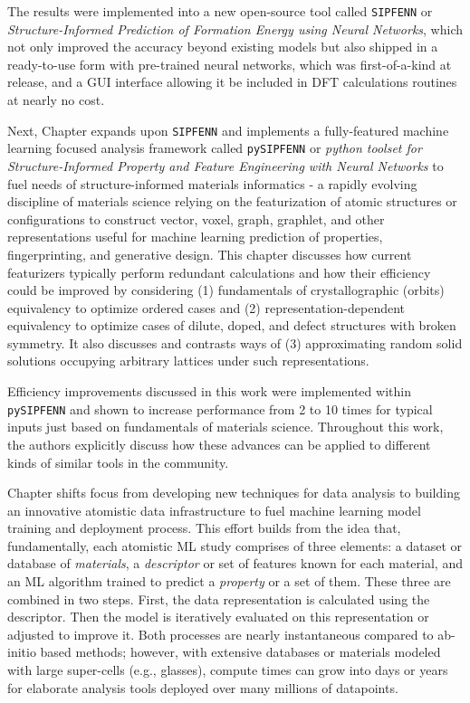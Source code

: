 The results were implemented into a new open-source tool called \texttt{SIPFENN} or \textit{Structure-Informed Prediction of Formation Energy using Neural Networks}, which not only improved the accuracy beyond existing models but also shipped in a ready-to-use form with pre-trained neural networks, which was first-of-a-kind at release, and a GUI interface allowing it be included in DFT calculations routines at nearly no cost.


Next, Chapter  expands upon \texttt{SIPFENN} and implements a fully-featured machine learning focused analysis framework called \texttt{pySIPFENN} or \textit{python toolset for Structure-Informed Property and Feature Engineering with Neural Networks} to fuel needs of structure-informed materials informatics - a rapidly evolving discipline of materials science relying on the featurization of atomic structures or configurations to construct vector, voxel, graph, graphlet, and other representations useful for machine learning prediction of properties, fingerprinting, and generative design. This chapter discusses how current featurizers typically perform redundant calculations and how their efficiency could be improved by considering (1) fundamentals of crystallographic (orbits) equivalency to optimize ordered cases and (2) representation-dependent equivalency to optimize cases of dilute, doped, and defect structures with broken symmetry. It also discusses and contrasts ways of (3) approximating random solid solutions occupying arbitrary lattices under such representations.

Efficiency improvements discussed in this work were implemented within \texttt{pySIPFENN} and shown to increase performance from 2 to 10 times for typical inputs just based on fundamentals of materials science. Throughout this work, the authors explicitly discuss how these advances can be applied to different kinds of similar tools in the community.


Chapter  shifts focus from developing new techniques for data analysis to building an innovative atomistic data infrastructure to fuel machine learning model training and deployment process. This effort builds from the idea that, fundamentally, each atomistic ML study comprises of three elements: a dataset or database of \emph{materials}, a \emph{descriptor} or set of features known for each material, and an ML algorithm trained to predict a \emph{property} or a set of them. These three are combined in two steps. First, the data representation is calculated using the descriptor. Then the model is iteratively evaluated on this representation or adjusted to improve it. Both processes are nearly instantaneous compared to ab-initio based methods; however, with extensive databases or materials modeled with large super-cells (e.g., glasses), compute times can grow into days or years for elaborate analysis tools deployed over many millions of datapoints. 


